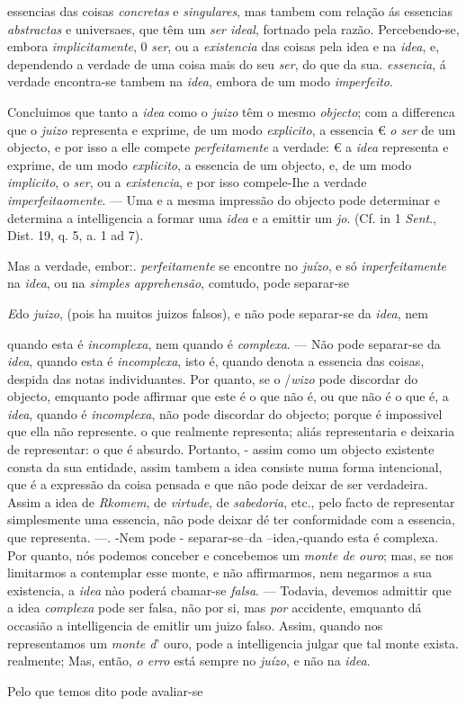 essencias das coisas \emph{concretas} e \emph{singulares}, mas tambem com relação ás essencias \emph{abstractas} e universaes, que têm um \emph{ser ideal}, fortnado pela razão. Percebendo-se, embora \emph{implicitamente}, 0 \emph{ser}, ou a \emph{existencia} das coisas pela idea e na \emph{idea}, e, dependendo a verdade de uma coisa mais do seu \emph{ser}, do que da sua. \emph{essencia}, á verdade encontra-se tambem na \emph{idea}, embora de um modo \emph{imperfeito}.\par Concluimos que tanto a \emph{idea} como o \emph{juizo} têm o mesmo \emph{objecto}; com a differenca que o \emph{juizo} representa e exprime, de um modo \emph{explicito}, a essencia € \emph{o ser} de um objecto, e por isso a elle compete \emph{perfeitamente} a verdade: € a \emph{idea} representa e exprime, de um modo \emph{explicito}, a essencia de um objecto, e, de um modo \emph{implicito}, o \emph{ser}, ou a \emph{existencia}, e por isso compele-Ihe a verdade \emph{imperfeitaomente}. --- Uma e a mesma impressão do objecto pode determinar e determina a intelligencia a formar uma \emph{idea} e a emittir um \emph{jo}. (Cf. in 1 \emph{Sent}., Dist. 19, q. 5, a. 1 ad 7).\par Mas a verdade, embor:. \emph{perfeitamente} se encontre no \emph{juízo}, e só \emph{inperfeitamente} na \emph{idea}, ou na \emph{simples apprehensão}, comtudo, pode separar-se\par \emph{E}do \emph{juizo}, (pois ha muitos juizos falsos), e não pode separar-se da \emph{idea}, nem\par quando esta é \emph{incomplexa}, nem quando é \emph{complexa}. --- Não pode separar-se da \emph{idea}, quando esta é \emph{incomplexa}, isto é, quando denota a essencia das coisas, despida das notas individuantes. Por quanto, se o /\emph{wizo} pode discordar do objecto, emquanto pode affirmar que este é o que não é, ou que não é o que é, a \emph{idea}, quando é \emph{incomplexa}, não pode discordar do objecto; porque é impossivel que ella não represente. o que realmente representa; aliás representaria e deixaria de representar: o que é absurdo. Portanto, - assim como um objecto existente consta da sua entidade, assim tambem a idea consiste numa forma intencional, que é a expressão da coisa pensada e que não pode deixar de ser verdadeira. Assim a idea de \emph{Rkomem}, de \emph{virtude}, de \emph{sabedoria}, etc., pelo facto de representar simplesmente uma essencia, não pode deixar dé ter conformidade com a essencia, que representa. ---. -Nem pode - separar-se--da --idea,-quando esta é complexa. Por quanto, nós podemos conceber e concebemos um \emph{monte de ouro}; mas, se nos limitarmos a contemplar esse monte, e não affirmarmos, nem negarmos a sua existencia, a \emph{idea} nào poderá cbamar-se \emph{falsa}. --- Todavia, devemos admittir que a idea \emph{complexa} pode ser falsa, não por si, mas \emph{por} accidente, emquanto dá occasião a intelligencia de emitlir um juizo falso. Assim, quando nos representamos um \emph{monte d}' ouro, pode a intelligencia julgar que tal monte exista. realmente; Mas, então, \emph{o erro} está sempre no \emph{juízo}, e não na \emph{idea}.\par Pelo que temos dito pode avaliar-se 